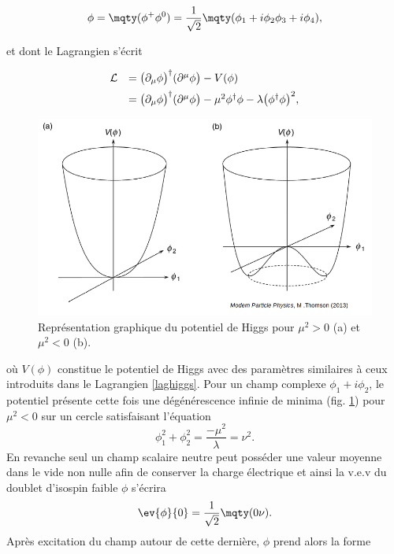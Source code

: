         \begin{equation}
            \phi = \mqty(\phi^+ \\ \phi^0) = \frac{1}{\sqrt{2}}\mqty(\phi_1+i\phi_2 \\ \phi_3 + i\phi_4),
        \label{higgsdoublet}
        \end{equation}

        et dont le Lagrangien s'écrit 

        \begin{equation}
        \begin{array}{ll}
            \mathcal{L}&=\bigl(\partial_{\mu}\phi\bigr)^{\dag}(\partial^{\mu}\phi\bigr)-V(\phi) \vspace{5pt} \\
            &=\bigl(\partial_{\mu}\phi\bigr)^{\dag}(\partial^{\mu}\phi\bigr)-\mu^2\phi^{\dag}\phi-\lambda\bigl(\phi^{\dag}\phi\bigr)^2,
        \end{array}
        \label{HiggsLag}
        \end{equation}

        \begin{figure}
        \centering
            \includegraphics[scale=0.4]{Chapitre2/Images/higgsV3D.png} 
            \caption{Représentation graphique du potentiel de Higgs pour $\mu^2>0$ (a) et $\mu^2<0$ (b).}
        \label{HiggsV3D}
        \end{figure}

        où $V(\phi)$ constitue le potentiel de Higgs avec des paramètres similaires à ceux introduits dans le Lagrangien \ref{laghiggs}. Pour un champ complexe $\phi_1+i\phi_2$, le potentiel présente cette fois une dégénérescence infinie de minima (fig. \ref{HiggsV3D}) pour $\mu^2<0$ sur un cercle satisfaisant l'équation $$\phi_1^2+\phi_2^2=\frac{-\mu^2}{\lambda}=\nu^2.$$ En revanche seul un champ scalaire neutre peut posséder une valeur moyenne dans le vide non nulle afin de conserver la charge électrique et ainsi la v.e.v du doublet d'isospin faible $\phi$ s'écrira $$\ev{\phi}{0}=\frac{1}{\sqrt{2}}\mqty(0 \\ \nu).$$ Après excitation du champ autour de cette dernière, $\phi$ prend alors la forme

